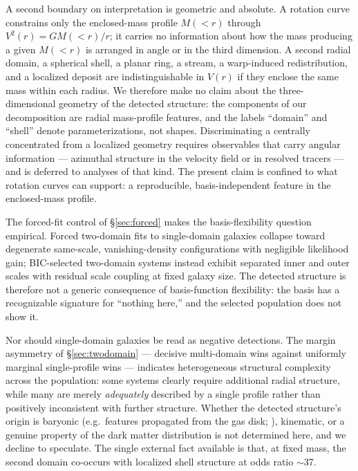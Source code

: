 \documentclass[twocolumn]{aastex701}
\begin{document}
A second boundary on interpretation is geometric and absolute. A rotation curve
constrains only the enclosed-mass profile $M({<}r)$ through $V^2(r) = G
M({<}r)/r$; it carries no information about how the mass producing a given
$M({<}r)$ is arranged in angle or in the third dimension. A second radial domain,
a spherical shell, a planar ring, a stream, a warp-induced redistribution, and a
localized deposit are indistinguishable in $V(r)$ if they enclose the same mass
within each radius. We therefore make no claim about the three-dimensional
geometry of the detected structure: the components of our decomposition are
radial mass-profile features, and the labels ``domain'' and ``shell'' denote
parameterizations, not shapes. Discriminating a centrally concentrated from a
localized geometry requires observables that carry angular information ---
azimuthal structure in the velocity field or in resolved tracers --- and is
deferred to analyses of that kind. The present claim is confined to what
rotation curves can support: a reproducible, basis-independent feature in the
enclosed-mass profile.

The forced-fit control of \S\ref{sec:forced} makes the basis-flexibility
question empirical. Forced two-domain fits to single-domain galaxies collapse
toward degenerate same-scale, vanishing-density configurations with
negligible likelihood gain; BIC-selected two-domain systems instead exhibit
separated inner and outer scales with residual scale coupling at fixed galaxy
size. The detected structure is therefore not a generic consequence of
basis-function flexibility: the basis has a recognizable signature for
``nothing here,'' and the selected population does not show it.

Nor should single-domain galaxies be read as negative detections. The margin
asymmetry of \S\ref{sec:twodomain} --- decisive multi-domain wins against
uniformly marginal single-profile wins --- indicates heterogeneous structural
complexity across the population: some systems clearly require additional
radial structure, while many are merely \emph{adequately} described by a
single profile rather than positively inconsistent with further structure.
Whether the detected structure's origin is baryonic (e.g.\ features
propagated from the gas disk; \citealt{Sancisi2004}), kinematic, or a genuine
property of the dark matter distribution is not determined here, and we
decline to speculate. The single external fact available is that, at fixed
mass, the second domain co-occurs with localized shell structure at odds
ratio $\sim$37.
\end{document}
